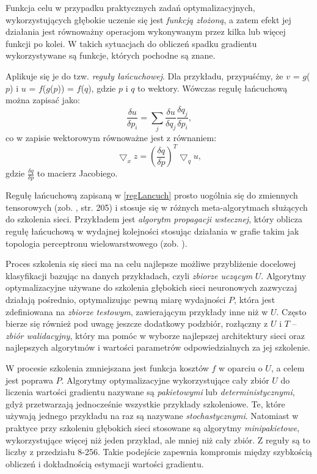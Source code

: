 Funkcja celu w przypadku praktycznych zadań optymalizacyjnych, wykorzystujących głębokie uczenie się jest \textit{funkcją złożoną}, a zatem efekt jej działania jest równoważny operacjom wykonywanym przez kilka lub więcej funkcji po kolei. W takich sytuacjach do obliczeń spadku gradientu wykorzystywane są funkcje, których pochodne są znane.

Aplikuje się je do tzw. \textit{reguły łańcuchowej}. Dla przykładu, przypuśćmy, że $v$ = $g$($p$) i $u$ = $f$($g$($p$)) = $f$($q$), gdzie $p$ i $q$ to wektory. Wówczas regułę łańcuchową można zapisać jako:
\begin{equation}
\frac{\delta u}{\delta p_i} = \sum_{j} \frac{\delta u}{\delta q_j} \frac{\delta q_j}{\delta p_i}, 
\end{equation}
co w zapisie wektorowym równoważne jest z równaniem:
\begin{equation}
\label{regLancuch}
\bigtriangledown_x z = (\frac{\delta q}{\delta p})^T \bigtriangledown_q u, 
\end{equation}
gdzie $\frac{\delta q}{\delta p}$ to macierz Jacobiego. 

Regułę łańcuchową zapisaną w \ref{regLancuch} prosto uogólnia się do zmiennych tensorowych (zob. \cite{Goodfellow-et-al-2016}, str. 205) i stosuje się w różnych meta-algorytmach służących do szkolenia sieci. Przykładem jest \textit{algorytm propagacji wstecznej}, który oblicza regułę łańcuchową w wydajnej kolejności stosując działania w grafie takim jak topologia perceptronu wielowarstwowego (zob. \cite{Goodfellow-et-al-2016}).

Proces szkolenia się sieci ma na celu najlepsze możliwe przybliżenie docelowej klasyfikacji bazując na danych przykładach, czyli \textit{zbiorze uczącym} $U$. Algorytmy optymalizacyjne używane do szkolenia głębokich sieci neuronowych zazwyczaj działają pośrednio, optymalizując pewną miarę wydajności $P$, która jest zdefiniowana na \textit{zbiorze testowym}, zawierającym przykłady inne niż w $U$. Często bierze się również pod uwagę jeszcze dodatkowy podzbiór, rozłączny z $U$ i $T$ -- \textit{zbiór walidacyjny}, który ma pomóc w wyborze najlepszej architektury sieci oraz najlepszych algorytmów i wartości parametrów odpowiedzialnych za jej szkolenie.

W procesie szkolenia zmniejszana jest funkcja kosztów $f$ w oparciu o $U$, a celem jest poprawa $P$. Algorytmy optymalizacyjne wykorzystujące cały zbiór $U$ do liczenia wartości gradientu nazywane są \textit{pakietowymi} lub \textit{deterministycznymi}, gdyż przetwarzają jednocześnie wszystkie przykłady szkoleniowe. Te, które używają jednego przykładu na raz są nazywane \textit{stochastycznymi}. Natomiast w praktyce przy szkoleniu głębokich sieci stosowane są algorytmy \textit{minipakietowe}, wykorzystujące więcej niż jeden przykład, ale mniej niż cały zbiór. Z reguły są to liczby z przedziału 8-256. Takie podejście zapewnia kompromis między szybkością obliczeń i dokładnością estymacji wartości gradientu.

